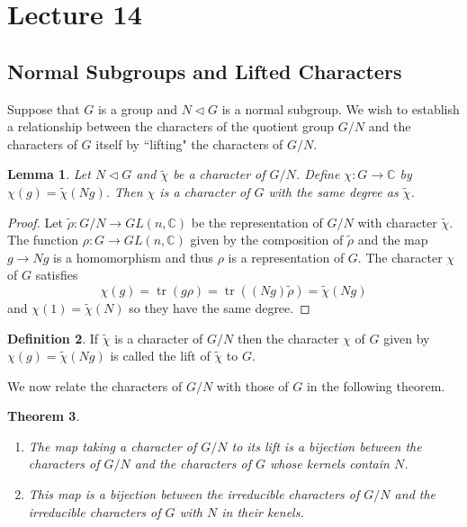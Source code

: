 \documentclass[11pt, notitlepage]{article}
\numberwithin{equation}{section}
\theoremstyle{plain}
\newtheorem{theorem}{Theorem}[section]
\newtheorem{lemma}[theorem]{Lemma}
\theoremstyle{definition}
\newtheorem{definition}[theorem]{Definition}
\DeclareMathOperator{\tr}{tr}
\begin{document}


\section{Lecture 14}

\subsection{Normal Subgroups and Lifted Characters}
Suppose that $G$ is a group and $N\triangleleft G$ is a normal subgroup. We wish to establish a relationship between the characters of the quotient group $G/N$ and the characters of $G$ itself by ``lifting" the characters of $G/N$.

\begin{lemma}
Let $N\triangleleft G$ and $\tilde{\chi}$ be a character of $G/N$. Define $\chi:G\to\mathbb{C}$ by $\chi(g) = \tilde{\chi}(Ng)$. Then $\chi$ is a character of $G$ with the same degree as $\tilde{\chi}$.
\end{lemma}
\begin{proof}
Let $\tilde\rho: G/N \to GL(n, \mathbb{C})$ be the representation of $G/N$ with character $\tilde\chi$. The function $\rho:G\to GL(n,\mathbb{C})$ given by the composition of $\tilde\rho$ and the map $g\to Ng$ is a homomorphism and thus $\rho$ is a representation of $G$. The character $\chi$ of $G$ satisfies
\[
	\chi(g) = \tr(g\rho) = \tr((Ng)\tilde\rho) = \tilde\chi(Ng) 
\]
and $\chi(1) = \tilde\chi(N)$ so they have the same degree.
\end{proof}

\begin{definition}
If $\tilde\chi$ is a character of $G/N$ then the character $\chi$ of $G$ given by $\chi(g) = \tilde\chi(Ng)$ is called the lift of $\tilde\chi$ to $G$.
\end{definition}

We now relate the characters of $G/N$ with those of $G$ in the following theorem.

\begin{theorem} ~
\begin{enumerate}[label=\emph{(\Roman*)}]
	\item The map taking a character of $G/N$ to its lift is a bijection between the characters of $G/N$ and the characters of $G$ whose kernels contain $N$.
	\item	This map is a bijection between the irreducible characters of $G/N$ and the irreducible characters of $G$ with $N$ in their kenels.
\end{enumerate} 

\end{theorem}
\end{document}
